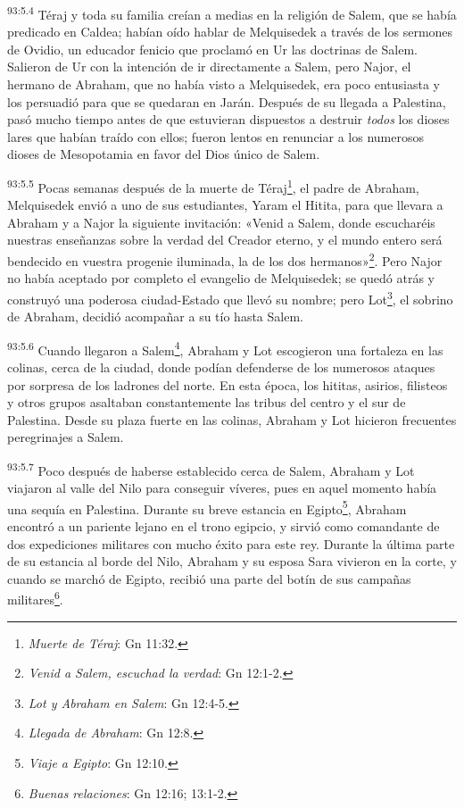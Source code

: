 \par
\textsuperscript{93:5.4} Téraj y toda su familia creían a medias en la religión de Salem, que se había predicado en Caldea; habían oído hablar de Melquisedek a través de los sermones de Ovidio, un educador fenicio que proclamó en Ur las doctrinas de Salem. Salieron de Ur con la intención de ir directamente a Salem, pero Najor, el hermano de Abraham, que no había visto a Melquisedek, era poco entusiasta y los persuadió para que se quedaran en Jarán. Después de su llegada a Palestina, pasó mucho tiempo antes de que estuvieran dispuestos a destruir \textit{todos} los dioses lares que habían traído con ellos; fueron lentos en renunciar a los numerosos dioses de Mesopotamia en favor del Dios único de Salem.

\par
\textsuperscript{93:5.5} Pocas semanas después de la muerte de Téraj\footnote{\textit{Muerte de Téraj}: Gn 11:32.}, el padre de Abraham, Melquisedek envió a uno de sus estudiantes, Yaram el Hitita, para que llevara a Abraham y a Najor la siguiente invitación: «Venid a Salem, donde escucharéis nuestras enseñanzas sobre la verdad del Creador eterno, y el mundo entero será bendecido en vuestra progenie iluminada, la de los dos hermanos»\footnote{\textit{Venid a Salem, escuchad la verdad}: Gn 12:1-2.}. Pero Najor no había aceptado por completo el evangelio de Melquisedek; se quedó atrás y construyó una poderosa ciudad-Estado que llevó su nombre; pero Lot\footnote{\textit{Lot y Abraham en Salem}: Gn 12:4-5.}, el sobrino de Abraham, decidió acompañar a su tío hasta Salem.

\par
\textsuperscript{93:5.6} Cuando llegaron a Salem\footnote{\textit{Llegada de Abraham}: Gn 12:8.}, Abraham y Lot escogieron una fortaleza en las colinas, cerca de la ciudad, donde podían defenderse de los numerosos ataques por sorpresa de los ladrones del norte. En esta época, los hititas, asirios, filisteos y otros grupos asaltaban constantemente las tribus del centro y el sur de Palestina. Desde su plaza fuerte en las colinas, Abraham y Lot hicieron frecuentes peregrinajes a Salem.

\par
\textsuperscript{93:5.7} Poco después de haberse establecido cerca de Salem, Abraham y Lot viajaron al valle del Nilo para conseguir víveres, pues en aquel momento había una sequía en Palestina. Durante su breve estancia en Egipto\footnote{\textit{Viaje a Egipto}: Gn 12:10.}, Abraham encontró a un pariente lejano en el trono egipcio, y sirvió como comandante de dos expediciones militares con mucho éxito para este rey. Durante la última parte de su estancia al borde del Nilo, Abraham y su esposa Sara vivieron en la corte, y cuando se marchó de Egipto, recibió una parte del botín de sus campañas militares\footnote{\textit{Buenas relaciones}: Gn 12:16; 13:1-2.}.

